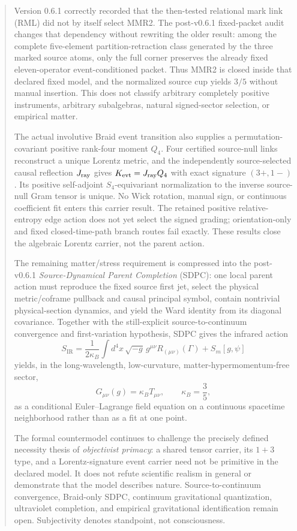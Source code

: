\documentclass[11pt]{article}
\theoremstyle{definition}
\theoremstyle{remark}
\begin{document}
\begin{abstract}
Version 0.6.1 correctly recorded that the then-tested relational mark link (RML) did not by itself select MMR2. The post-v0.6.1 fixed-packet audit changes that dependency without rewriting the older result: among the complete five-element partition-retraction class generated by the three marked source atoms, only the full corner preserves the already fixed eleven-operator event-conditioned packet. Thus MMR2 is closed inside that declared fixed model, and the normalized source cup yields $3/5$ without manual insertion. This does not classify arbitrary completely positive instruments, arbitrary subalgebras, natural signed-sector selection, or empirical matter.

The actual involutive Braid event transition also supplies a permutation-covariant positive rank-four moment $Q_4$. Four certified source-null links reconstruct a unique Lorentz metric, and the independently source-selected causal reflection $J_{\rm ray}$ gives $K_{\rm evt}=J_{\rm ray}Q_4$ with exact signature $(3+,1-)$. Its positive self-adjoint $S_4$-equivariant normalization to the inverse source-null Gram tensor is unique. No Wick rotation, manual sign, or continuous coefficient fit enters this carrier result. The retained positive relative-entropy edge action does not yet select the signed grading; orientation-only and fixed closed-time-path branch routes fail exactly. These results close the algebraic Lorentz carrier, not the parent action.

The remaining matter/stress requirement is compressed into the post-v0.6.1 \emph{Source-Dynamical Parent Completion} (SDPC): one local parent action must reproduce the fixed source first jet, select the physical metric/coframe pullback and causal principal symbol, contain nontrivial physical-section dynamics, and yield the Ward identity from its diagonal covariance. Together with the still-explicit source-to-continuum convergence and first-variation hypothesis, SDPC gives the infrared action
\[
S_{\mathrm{IR}}=\frac{1}{2\kappa_B}\int d^4x\,\sqrt{-g}\,
g^{\mu\nu}R_{(\mu\nu)}(\Gamma)+S_m[g,\psi]
\]
yields, in the long-wavelength, low-curvature, matter-hypermomentum-free sector,
\[
G_{\mu\nu}(g)=\kappa_B T_{\mu\nu},\qquad \kappa_B=\frac35,
\]
as a conditional Euler--Lagrange field equation on a continuous spacetime neighborhood rather than as a fit at one point.

The formal countermodel continues to challenge the precisely defined necessity thesis of \emph{objectivist primacy}: a shared tensor carrier, its $1+3$ type, and a Lorentz-signature event carrier need not be primitive in the declared model. It does not refute scientific realism in general or demonstrate that the model describes nature. Source-to-continuum convergence, Braid-only SDPC, continuum gravitational quantization, ultraviolet completion, and empirical gravitational identification remain open. Subjectivity denotes standpoint, not consciousness.
\end{abstract}
\end{document}
